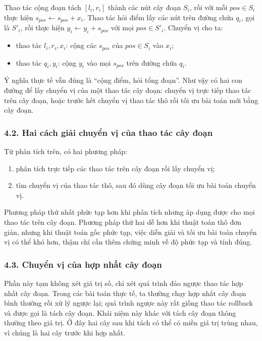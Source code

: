\documentclass[11pt]{article}
\begin{document}
Thao tác cộng đoạn tách \([l_i,r_i]\) thành các nút cây đoạn \(S_i\), rồi với
mỗi \(pos\in S_i\) thực hiện \(s_{pos}\leftarrow s_{pos}+x_i\). Thao tác hỏi
điểm lấy các nút trên đường chứa \(q_i\), gọi là \(S'_i\), rồi thực hiện
\(y_i\leftarrow y_i+s_{pos}\) với mọi \(pos\in S'_i\). Chuyển vị cho ta:
\begin{itemize}
  \item thao tác \(l_i,r_i,x_i\): cộng các \(s_{pos}\) của \(pos\in S_i\) vào
  \(x_i\);
  \item thao tác \(q_i,y_i\): cộng \(y_i\) vào mọi \(s_{pos}\) trên đường chứa
  \(q_i\).
\end{itemize}
Ý nghĩa thực tế vẫn đúng là ``cộng điểm, hỏi tổng đoạn''. Như vậy có hai con
đường để lấy chuyển vị của một thao tác cây đoạn: chuyển vị trực tiếp thao tác
trên cây đoạn, hoặc trước hết chuyển vị thao tác thô rồi tối ưu bài toán mới
bằng cây đoạn.

\subsubsection*{4.2. Hai cách giải chuyển vị của thao tác cây đoạn}

Từ phân tích trên, có hai phương pháp:
\begin{enumerate}
  \item phân tích trực tiếp các thao tác trên cây đoạn rồi lấy chuyển vị;
  \item tìm chuyển vị của thao tác thô, sau đó dùng cây đoạn tối ưu bài toán
  chuyển vị.
\end{enumerate}
Phương pháp thứ nhất phức tạp hơn khi phân tích nhưng áp dụng được cho mọi thao
tác trên cây đoạn. Phương pháp thứ hai dễ hơn khi thuật toán thô đơn giản, nhưng
khi thuật toán gốc phức tạp, việc diễn giải và tối ưu bài toán chuyển vị có thể
khó hơn, thậm chí cần thêm chứng minh về độ phức tạp và tính đúng.

\subsubsection*{4.3. Chuyển vị của hợp nhất cây đoạn}

Phần này tạm không xét giá trị số, chỉ xét quá trình đảo ngược thao tác hợp
nhất cây đoạn. Trong các bài toán thực tế, ta thường chạy hợp nhất cây đoạn
bình thường rồi xử lý ngược lại; quá trình ngược này rất giống thao tác rollback
và được gọi là tách cây đoạn. Khái niệm này khác với tách cây đoạn thông
thường theo giá trị. Ở đây hai cây sau khi tách có thể có miền giá trị trùng
nhau, vì chúng là hai cây trước khi hợp nhất.
\end{document}
